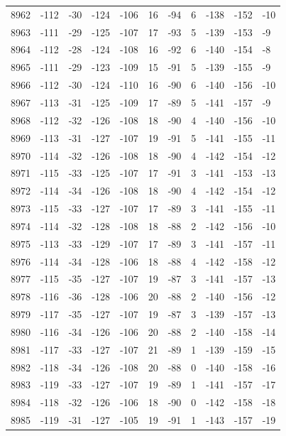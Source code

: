 \begin{table}[H]
\begin{tabular}{lllllllllll}
8962 & -112 & -30 & -124 & -106 & 16 & -94 & 6 & -138 & -152 & -10 \\
8963 & -111 & -29 & -125 & -107 & 17 & -93 & 5 & -139 & -153 & -9 \\
8964 & -112 & -28 & -124 & -108 & 16 & -92 & 6 & -140 & -154 & -8 \\
8965 & -111 & -29 & -123 & -109 & 15 & -91 & 5 & -139 & -155 & -9 \\
8966 & -112 & -30 & -124 & -110 & 16 & -90 & 6 & -140 & -156 & -10 \\
8967 & -113 & -31 & -125 & -109 & 17 & -89 & 5 & -141 & -157 & -9 \\
8968 & -112 & -32 & -126 & -108 & 18 & -90 & 4 & -140 & -156 & -10 \\
8969 & -113 & -31 & -127 & -107 & 19 & -91 & 5 & -141 & -155 & -11 \\
8970 & -114 & -32 & -126 & -108 & 18 & -90 & 4 & -142 & -154 & -12 \\
8971 & -115 & -33 & -125 & -107 & 17 & -91 & 3 & -141 & -153 & -13 \\
8972 & -114 & -34 & -126 & -108 & 18 & -90 & 4 & -142 & -154 & -12 \\
8973 & -115 & -33 & -127 & -107 & 17 & -89 & 3 & -141 & -155 & -11 \\
8974 & -114 & -32 & -128 & -108 & 18 & -88 & 2 & -142 & -156 & -10 \\
8975 & -113 & -33 & -129 & -107 & 17 & -89 & 3 & -141 & -157 & -11 \\
8976 & -114 & -34 & -128 & -106 & 18 & -88 & 4 & -142 & -158 & -12 \\
8977 & -115 & -35 & -127 & -107 & 19 & -87 & 3 & -141 & -157 & -13 \\
8978 & -116 & -36 & -128 & -106 & 20 & -88 & 2 & -140 & -156 & -12 \\
8979 & -117 & -35 & -127 & -107 & 19 & -87 & 3 & -139 & -157 & -13 \\
8980 & -116 & -34 & -126 & -106 & 20 & -88 & 2 & -140 & -158 & -14 \\
8981 & -117 & -33 & -127 & -107 & 21 & -89 & 1 & -139 & -159 & -15 \\
8982 & -118 & -34 & -126 & -108 & 20 & -88 & 0 & -140 & -158 & -16 \\
8983 & -119 & -33 & -127 & -107 & 19 & -89 & 1 & -141 & -157 & -17 \\
8984 & -118 & -32 & -126 & -106 & 18 & -90 & 0 & -142 & -158 & -18 \\
8985 & -119 & -31 & -127 & -105 & 19 & -91 & 1 & -143 & -157 & -19 \\

\end{tabular}
\end{table}
